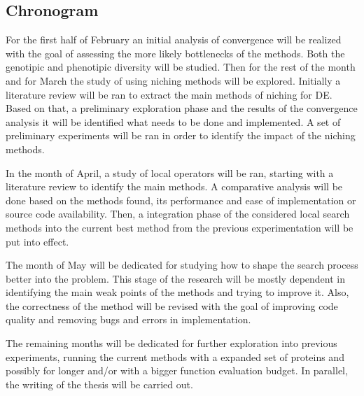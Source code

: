 \subsection{Chronogram}

For the first half of February an initial analysis of convergence will be
realized with the goal of assessing the more likely bottlenecks of the methods.
Both the genotipic and phenotipic diversity will be studied. Then for the rest
of the month and for March the study of using niching methods will be explored.
Initially a literature review will be ran to extract the main methods of
niching for DE.  Based on that, a preliminary exploration phase and the results
of the convergence analysis it will be identified what needs to be done and
implemented. A set of preliminary experiments will be ran in order to identify
the impact of the niching methods.

In the month of April, a study of local operators will be ran, starting with a
literature review to identify the main methods.  A comparative analysis will be
done based on the methods found, its performance and ease of implementation or
source code availability. Then, a integration phase of the considered local
search methods into the current best method from the previous experimentation
will be put into effect.

The month of May will be dedicated for studying how to shape the search process
better into the problem. This stage of the research will be mostly dependent in
identifying the main weak points of the methods and trying to improve it. Also,
the correctness of the method will be revised with the goal of improving code
quality and removing bugs and errors in implementation.

The remaining months will be dedicated for further exploration into previous
experiments, running the current methods with a expanded set of proteins and
possibly for longer and/or with a bigger function evaluation budget. In
parallel, the writing of the thesis will be carried out.
